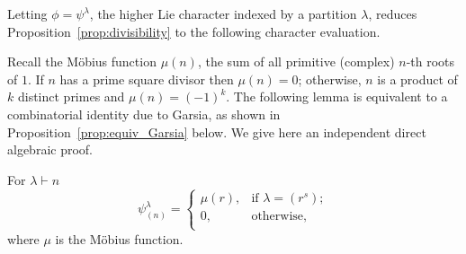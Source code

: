 \documentclass[ALCO,published]{cedram}
\begin{document}
Letting $\phi = \psi^\lambda$, the higher Lie character indexed by a partition $\lambda$, reduces Proposition~\ref{prop:divisibility} to the following character evaluation. 

Recall the M\"obius function $\mu(n)$, the sum of all primitive (complex) $n$-th roots of $1$. If $n$ has a prime square divisor then $\mu(n)=0$; otherwise, $n$ is a product of $k$ distinct primes and $\mu(n)=(-1)^k$. 
The following lemma is equivalent to a combinatorial identity due to Garsia, as shown in  Proposition~\ref{prop:equiv_Garsia} below. We give here an independent direct algebraic proof.

\begin{lemma}\label{lem:char_eval_cycles}
    For $\lambda \vdash n$
    \[
        \psi^\lambda_{(n)} =
        \begin{cases} 
            \mu(r), &\text{if } \lambda = (r^s);\\
	       0, &\text{otherwise,}\\
        \end{cases}
    \]
    where $\mu$ is the M\"obius function.
\end{lemma}
\end{document}
